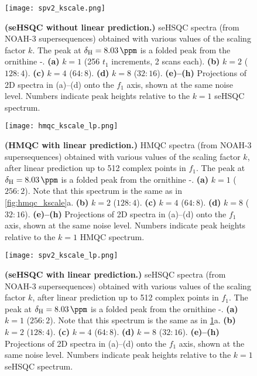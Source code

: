 \begin{figure}
    \centering
    \texttt{[image: spv2\_kscale.png]}
    \caption{
        \textbf{(seHSQC without linear prediction.)}
        \nitrogen{} seHSQC spectra (from NOAH-3  supersequences) obtained with various values of the scaling factor $k$.
        The peak at $\delta_{\ce{H}} = \SI{8.03}{\ppm}$ is a folded peak from the ornithine \textdelta-.
        \textbf{(a)} $k = 1$ (256 $t_1$ increments, 2 scans each).
        \textbf{(b)} $k = 2$ ($128:4$).
        \textbf{(c)} $k = 4$ ($64:8$).
        \textbf{(d)} $k = 8$ ($32:16$).
        \textbf{(e)--(h)} Projections of 2D spectra in (a)--(d) onto the $f_1$ axis, shown at the same noise level.
        Numbers indicate peak heights relative to the $k = 1$ seHSQC spectrum.
        \grami{}
    }
    \label{fig:spv2_kscale}
\end{figure}

\begin{figure}
    \centering
    \texttt{[image: hmqc\_kscale\_lp.png]}
    \caption{
        \textbf{(HMQC with linear prediction.)}
        \nitrogen{} HMQC spectra (from NOAH-3  supersequences) obtained with various values of the scaling factor $k$, after linear prediction up to 512 complex points in $f_1$.
        The peak at $\delta_{\ce{H}} = \SI{8.03}{\ppm}$ is a folded peak from the ornithine \textdelta-.
        \textbf{(a)} $k = 1$ ($256:2$). Note that this spectrum is the same as in \cref{fig:hmqc_kscale}a.
        \textbf{(b)} $k = 2$ ($128:4$).
        \textbf{(c)} $k = 4$ ($64:8$).
        \textbf{(d)} $k = 8$ ($32:16$).
        \textbf{(e)--(h)} Projections of 2D spectra in (a)--(d) onto the $f_1$ axis, shown at the same noise level.
        Numbers indicate peak heights relative to the $k = 1$ HMQC spectrum.
        \grami{}
    }
    \label{fig:hmqc_kscale_lp}
\end{figure}

\begin{figure}
    \centering
    \texttt{[image: spv2\_kscale\_lp.png]}
    \caption{
        \textbf{(seHSQC with linear prediction.)}
        \nitrogen{} seHSQC spectra (from NOAH-3  supersequences) obtained with various values of the scaling factor $k$, after linear prediction up to 512 complex points in $f_1$.
        The peak at $\delta_{\ce{H}} = \SI{8.03}{\ppm}$ is a folded peak from the ornithine \textdelta-.
        \textbf{(a)} $k = 1$ ($256:2$). Note that this spectrum is the same as in \cref{fig:spv2_kscale}a.
        \textbf{(b)} $k = 2$ ($128:4$).
        \textbf{(c)} $k = 4$ ($64:8$).
        \textbf{(d)} $k = 8$ ($32:16$).
        \textbf{(e)--(h)} Projections of 2D spectra in (a)--(d) onto the $f_1$ axis, shown at the same noise level.
        Numbers indicate peak heights relative to the $k = 1$ seHSQC spectrum.
        \grami{}
    }
    \label{fig:spv2_kscale_lp}
\end{figure}

